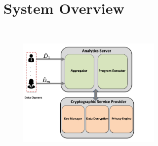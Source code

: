 
\section{System Overview} \begin{figure}\includegraphics[height=7cm, width=7cm]{hh.png}\end{figure}
